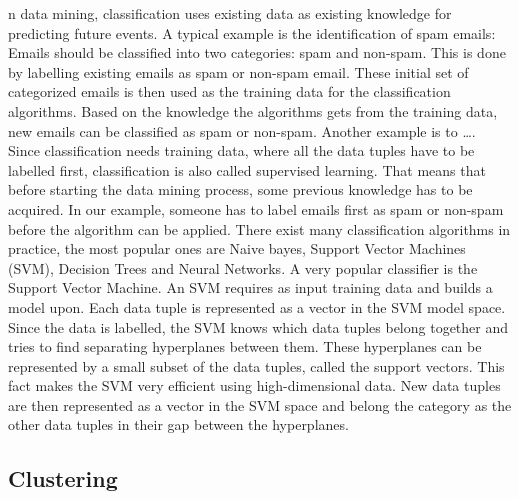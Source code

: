 n data mining, classification uses existing data as existing knowledge for predicting future events. A typical example is the identification of spam emails: Emails should be classified into two categories: spam and non-spam. This is done by labelling existing emails as spam or non-spam email. These initial set of categorized emails is then used as the training data for the classification algorithms. Based on the knowledge the algorithms gets from the training data, new emails can be classified as spam or non-spam.
Another example is to ….
Since classification needs training data, where all the data tuples have to be labelled first, classification is also called supervised learning. That means that before starting the data mining process, some previous knowledge has to be acquired. In our example, someone has to label emails first as spam or non-spam before the algorithm can be applied. 
There exist many classification algorithms in practice, the most popular ones are Naive bayes, Support Vector Machines (SVM), Decision Trees and Neural Networks.
A very popular classifier is the Support Vector Machine. An SVM requires as input training data and builds a model upon. Each data tuple is represented as a vector in the SVM model space. Since the data is labelled, the SVM knows which data tuples belong together and tries to find separating hyperplanes between them. These hyperplanes can be represented by a small subset of the data tuples, called the support vectors. This fact makes the SVM very efficient using high-dimensional data. New data tuples are then represented as a vector in the SVM space and belong the category as the other data tuples in their gap between the hyperplanes.

\subsection{Clustering}

